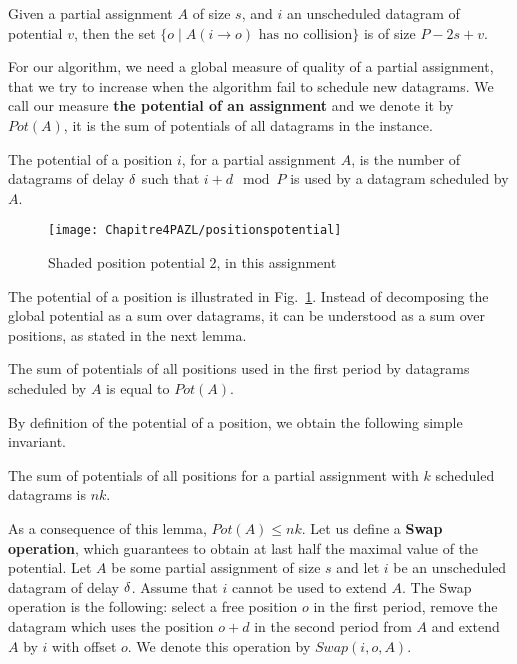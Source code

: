 \begin{lemma}
Given a partial assignment $A$ of size $s$, and $i$ an unscheduled datagram of potential 
$v$, then the set $\{o \mid A(i \rightarrow o) \text{ has no collision}\}$ is of size $P - 2s + v$.
\end{lemma}

For our algorithm, we need a global measure of quality of a partial assignment, 
that we try to increase when the algorithm fail to schedule new datagrams. 
We call our measure \textbf{the potential of an assignment} and we denote it by $Pot(A)$, it is the sum of potentials of all datagrams in the instance.


\begin{definition}
The potential of a position $i$, for a partial assignment $A$, is the number of datagrams of delay $\delta$ such that $i+d \mod P$ is used by a datagram scheduled by $A$. 
\end{definition}

\begin{figure}
 \begin{center}
\texttt{[image: Chapitre4PAZL/positionspotential]}
\end{center}
\caption{Shaded position potential $2$, in this assignment}
\label{fig:positionpotential} 
\end{figure}

The potential of a position is illustrated in Fig.~\ref{fig:positionpotential}.
Instead of decomposing the global potential as a sum over datagrams, it can be understood
as a sum over positions, as stated in the next lemma.

\begin{lemma}\label{lemma:pot_pos}
The sum of potentials of all positions used in the first period by datagrams scheduled by $A$ is equal to $Pot(A)$.  
\end{lemma}

By definition of the potential of a position, we obtain the following simple invariant.

\begin{lemma}\label{lemma:inv}
The sum of potentials of all positions for a partial assignment with $k$ scheduled datagrams is $nk$.  
\end{lemma}

 As a consequence of this lemma, $Pot(A) \leq nk$. Let us define a \textbf{Swap operation},
 which guarantees to obtain at last half the maximal value of the potential.
Let $A$ be some partial assignment of size $s$ and let $i$ be an unscheduled datagram of delay $\delta$. 
Assume that $i$ cannot be used to extend $A$. The Swap operation is the following: 
select a free position $o$ in the first period, remove the datagram which uses the position $o+d$ in the second period from $A$ and extend $A$ by $i$ with offset $o$. We denote this operation by $Swap(i,o,A)$.

